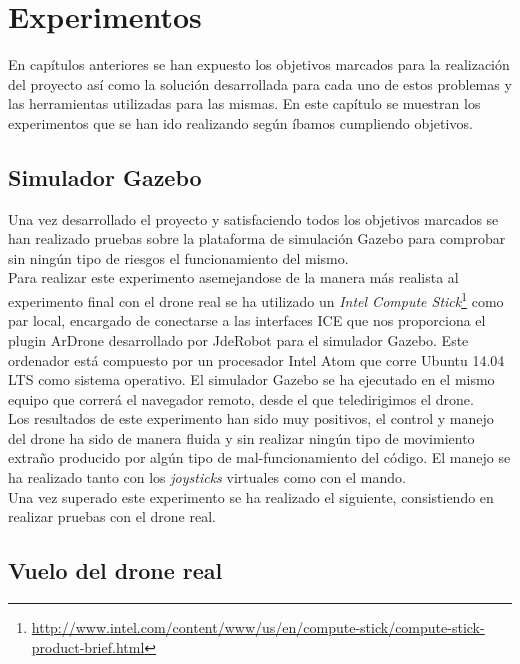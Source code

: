 \chapter{Experimentos}

En capítulos anteriores se han expuesto los objetivos marcados para la realización del proyecto así como la solución desarrollada para cada uno de estos problemas y las herramientas utilizadas para las mismas. En este capítulo se muestran los experimentos que se han ido realizando según íbamos cumpliendo objetivos.\\

\section{Simulador Gazebo}

Una vez desarrollado el proyecto y satisfaciendo todos los objetivos marcados se han realizado pruebas sobre la plataforma de simulación Gazebo para comprobar sin ningún tipo de riesgos el funcionamiento del mismo.\\

Para realizar este experimento asemejandose de la manera más realista al experimento final con el drone real se ha utilizado un \emph{Intel Compute Stick}\footnote{\url{http://www.intel.com/content/www/us/en/compute-stick/compute-stick-product-brief.html}} como par local, encargado de conectarse a las interfaces ICE que nos proporciona el plugin ArDrone desarrollado por JdeRobot para el simulador Gazebo. Este ordenador está compuesto por un procesador Intel Atom que corre Ubuntu 14.04 LTS como sistema operativo. El simulador Gazebo se ha ejecutado en el mismo equipo que correrá el navegador remoto, desde el que teledirigimos el drone.\\

Los resultados de este experimento han sido muy positivos, el control y manejo del drone ha sido de manera fluida y sin realizar ningún tipo de movimiento extraño producido por algún tipo de mal-funcionamiento del código. El manejo se ha realizado tanto con los \emph{joysticks} virtuales como con el mando.\\

Una vez superado este experimento se ha realizado el siguiente, consistiendo en realizar pruebas con el drone real.\\

\section{Vuelo del drone real}

